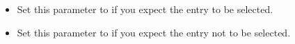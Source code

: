 
\begin{itemize}
\item Set this parameter to  if you expect the entry to be selected. 
\item Set this parameter to  if you expect the entry not to be selected. 
\end{itemize}

